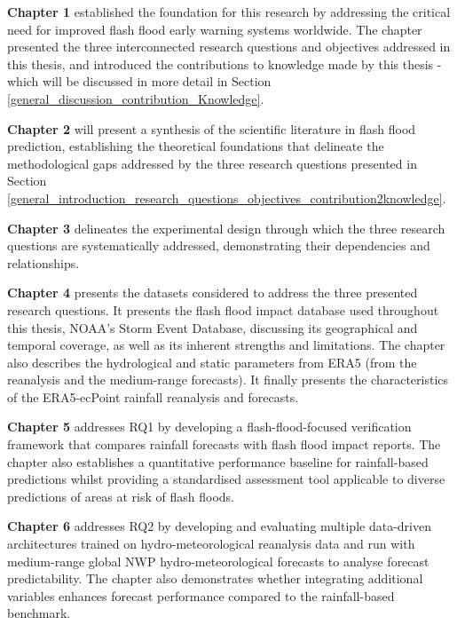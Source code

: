 \textbf{Chapter 1} established the foundation for this research by addressing the critical need for improved flash flood early warning systems worldwide. The chapter presented the three interconnected research questions and objectives addressed in this thesis, and introduced the contributions to knowledge made by this thesis - which will be discussed in more detail in Section \ref{general_discussion_contribution_Knowledge}.

\textbf{Chapter 2} will present a synthesis of the scientific literature in flash flood prediction, establishing the theoretical foundations that delineate the methodological gaps addressed by the three research questions presented in Section \ref{general_introduction_research_questions_objectives_contribution2knowledge}.

\textbf{Chapter 3} delineates the experimental design through which the three research questions are systematically addressed, demonstrating their dependencies and relationships.

\textbf{Chapter 4} presents the datasets considered to address the three presented research questions. It presents the flash flood impact database used throughout this thesis, NOAA's Storm Event Database, discussing its geographical and temporal coverage, as well as its inherent strengths and limitations. The chapter also describes the hydrological and static parameters from ERA5 (from the reanalysis and the medium-range forecasts). It finally presents the characteristics of the ERA5-ecPoint rainfall reanalysis and forecasts.

\textbf{Chapter 5}
addresses RQ1 by developing a flash-flood-focused verification framework that compares rainfall forecasts with flash flood impact reports. The chapter also establishes a quantitative performance baseline for rainfall-based predictions whilst providing a standardised assessment tool applicable to diverse predictions of areas at risk of flash floods.

\textbf{Chapter 6} addresses RQ2 by developing and evaluating multiple data-driven architectures trained on hydro-meteorological reanalysis data and run with medium-range global NWP hydro-meteorological forecasts to analyse forecast predictability. The chapter also demonstrates whether integrating additional variables enhances forecast performance compared to the rainfall-based benchmark.

